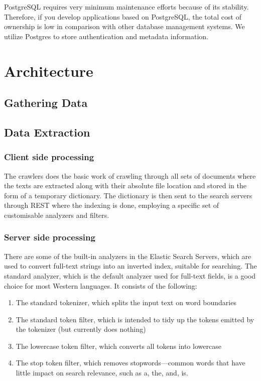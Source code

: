 \documentclass[a4paper,12pt,oneside]{book}
\begin{document}
PostgreSQL requires very minimum maintenance efforts because of its stability.  Therefore, if you develop applications based on PostgreSQL, the total cost of ownership is low in comparison with other database management systems.
We utilize Postgres to store authentication and metadata information.

\lipsum[5]

\chapter{Architecture}

\blindtext[2]

\section{Gathering Data}
\lipsum[4]

\section{Data Extraction}
\subsection{Client side processing}
The crawlers does the basic work of crawling through all sets of documents where the texts are extracted  along with their absolute file location and stored in the form of a temporary dictionary. The dictionary is then sent to the search servers through REST where the indexing is done, employing a specific set of customisable analyzers and filters.

\subsection{Server side processing}
There are some of the built-in analyzers in the Elastic Search Servers, which are used to convert full-text strings into an inverted index, suitable for searching. The standard analyzer, which is the default analyzer used for full-text fields, is a good choice for most Western languages. It consists of the following:

\begin{enumerate}
    \item The standard tokenizer, which splits the input text on word boundaries
    \item The standard token filter, which is intended to tidy up the tokens emitted by the tokenizer (but currently does nothing)
    \item The lowercase token filter, which converts all tokens into lowercase
    \item The stop token filter, which removes stopwords—common words that have little impact on search relevance, such as a, the, and, is.
\end{enumerate}
\end{document}
